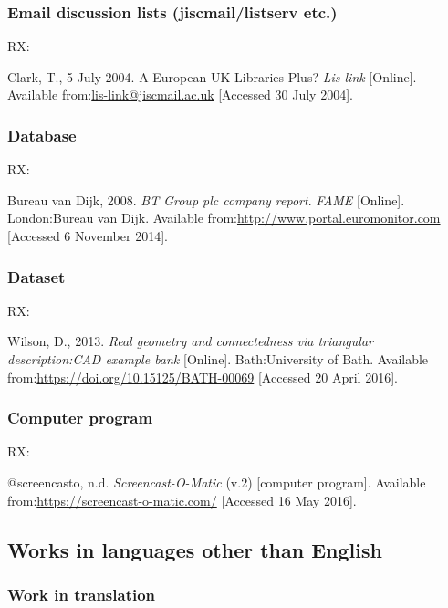 \subsubsection*{Email discussion lists (jiscmail\slash listserv etc.)}

RX: \cite{clark2004euk}

Clark, T., 5 July 2004. A European UK Libraries Plus? \emph{Lis-link} [Online]. Available from:\@ \url{lis-link@jiscmail.ac.uk} [Accessed 30 July 2004].



\subsubsection*{Database}

RX: \cite{bvd2008bt}

Bureau van Dijk, 2008. \emph{BT Group plc company report}. \emph{FAME} [Online]. London:\@ Bureau van Dijk. Available from:\@ \url{http://www.portal.euromonitor.com} [Accessed 6 November 2014].



\subsubsection*{Dataset}

RX: \cite{wilson2013rgc}

Wilson, D., 2013. \emph{Real geometry and connectedness via triangular description:\@ CAD example bank} [Online]. Bath:\@ University of Bath. Available from:\@ \url{https://doi.org/10.15125/BATH-00069} [Accessed 20 April 2016].



\subsubsection*{Computer program}

RX: \cite{screencasto}

@screencasto, n.d. \emph{Screencast-O-Matic} (v.2) [computer program]. Available from:\@ \url{https://screencast-o-matic.com/} [Accessed 16 May 2016].



\subsection{Works in languages other than English}

\subsubsection*{Work in translation}

